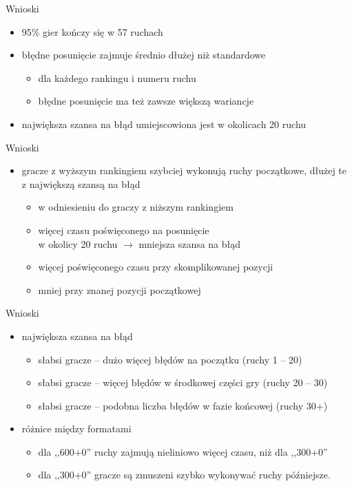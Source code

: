 \documentclass{beamer}
\begin{document}
\begin{frame}{Wnioski}
	\begin{itemize}
		\item 95\% gier kończy się w 57 ruchach
		\item błędne posunięcie zajmuje średnio dłużej niż standardowe 
		\begin{itemize}
			\item dla każdego rankingu i numeru ruchu
			\item błędne posunięcie ma też zawsze większą wariancje
		\end{itemize}
		\item największa szansa na błąd umiejscowiona jest w okolicach 20 ruchu
	\end{itemize}
\end{frame}
\begin{frame}{Wnioski}
	\begin{itemize}
		
		\item gracze z wyższym rankingiem szybciej wykonują ruchy początkowe, dłużej te z największą szansą na błąd
		\begin{itemize}
			\item w odniesieniu do graczy z niższym rankingiem
			\item więcej czasu poświęconego na posunięcie\\ w okolicy 20 ruchu $\rightarrow$ mniejsza szansa na błąd
			\item więcej poświęconego czasu przy skomplikowanej pozycji
			\item mniej przy znanej pozycji początkowej
		\end{itemize}		
		
	\end{itemize}
\end{frame}

\begin{frame}{Wnioski}
	\begin{itemize}
		\item największa szansa na błąd
		\begin{itemize}
			\item słabsi gracze -- dużo więcej błędów na początku (ruchy 1 -- 20)
			\item słabsi gracze -- więcej błędów w środkowej części gry (ruchy 20 -- 30)
			\item słabsi gracze -- podobna liczba błędów w fazie końcowej (ruchy 30+)
		\end{itemize} 
		\item różnice między formatami
		\begin{itemize}
			\item dla ,,600+0'' ruchy zajmują nieliniowo więcej czasu, niż dla ,,300+0'' 
			\item dla ,,300+0'' gracze są zmuszeni szybko wykonywać ruchy późniejsze.
		\end{itemize} 
\end{itemize}
\end{frame}
\end{document}
